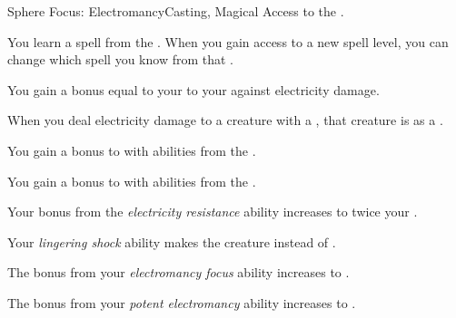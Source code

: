     \begin{feat}{Sphere Focus: Electromancy}{Casting, Magical}
        \featpre Access to the  .

         You learn a spell from the  .
        When you gain access to a new spell level, you can change which spell you know from that .

         You gain a bonus equal to your  to your  against electricity damage.

         When you deal electricity damage to a creature with a , that creature is  as a .

         You gain a  bonus to  with abilities from the  .

         You gain a  bonus to  with abilities from the  .

         Your bonus from the \textit{electricity resistance} ability increases to twice your .

         Your \textit{lingering shock} ability makes the creature  instead of .

         The bonus from your \textit{electromancy focus} ability increases to .

         The bonus from your \textit{potent electromancy} ability increases to .
    \end{feat}

